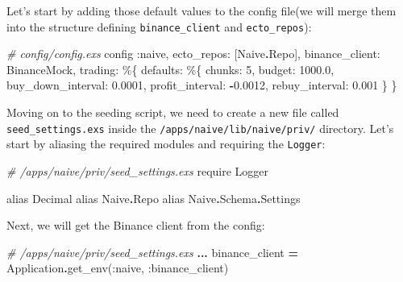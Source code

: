 \documentclass[
  oneside]{book}
\newenvironment{Shaded}{\begin{snugshade}}{\end{snugshade}}
\newcommand{\CommentTok}[1]{\textcolor[rgb]{0.56,0.35,0.01}{\textit{#1}}}
\newcommand{\ConstantTok}[1]{\textcolor[rgb]{0.00,0.00,0.00}{#1}}
\newcommand{\DecValTok}[1]{\textcolor[rgb]{0.00,0.00,0.81}{#1}}
\newcommand{\FloatTok}[1]{\textcolor[rgb]{0.00,0.00,0.81}{#1}}
\newcommand{\ImportTok}[1]{#1}
\newcommand{\NormalTok}[1]{#1}
\newcommand{\OperatorTok}[1]{\textcolor[rgb]{0.81,0.36,0.00}{\textbf{#1}}}
\newcommand{\VariableTok}[1]{\textcolor[rgb]{0.00,0.00,0.00}{#1}}
\begin{document}
Let's start by adding those default values to the config file(we will merge them into the structure defining \texttt{binance\_client} and \texttt{ecto\_repos}):

\begin{Shaded}
\begin{Highlighting}[]
\CommentTok{\# config/config.exs}
\NormalTok{config }\VariableTok{:naive}\NormalTok{,}
  \VariableTok{ecto\_repos:}\NormalTok{ [}\ConstantTok{Naive}\OperatorTok{.}\ConstantTok{Repo}\NormalTok{],}
  \VariableTok{binance\_client:} \ConstantTok{BinanceMock}\NormalTok{,}
  \VariableTok{trading:}\NormalTok{ \%\{}
    \VariableTok{defaults:}\NormalTok{ \%\{}
      \VariableTok{chunks:} \DecValTok{5}\NormalTok{,}
      \VariableTok{budget:} \FloatTok{1000.0}\NormalTok{,}
      \VariableTok{buy\_down\_interval:} \FloatTok{0.0001}\NormalTok{,}
      \VariableTok{profit\_interval:} \OperatorTok{{-}}\FloatTok{0.0012}\NormalTok{,}
      \VariableTok{rebuy\_interval:} \FloatTok{0.001}
\NormalTok{    \}}
\NormalTok{  \}}
\end{Highlighting}
\end{Shaded}

Moving on to the seeding script, we need to create a new file called \texttt{seed\_settings.exs} inside the \texttt{/apps/naive/lib/naive/priv/} directory. Let's start by aliasing the required modules and requiring the \texttt{Logger}:

\begin{Shaded}
\begin{Highlighting}[]
\CommentTok{\# /apps/naive/priv/seed\_settings.exs}
\ImportTok{require} \ConstantTok{Logger}

\ImportTok{alias} \ConstantTok{Decimal}
\ImportTok{alias} \ConstantTok{Naive}\OperatorTok{.}\ConstantTok{Repo}
\ImportTok{alias} \ConstantTok{Naive}\OperatorTok{.}\ConstantTok{Schema}\OperatorTok{.}\ConstantTok{Settings}
\end{Highlighting}
\end{Shaded}

Next, we will get the Binance client from the config:

\begin{Shaded}
\begin{Highlighting}[]
\CommentTok{\# /apps/naive/priv/seed\_settings.exs}
\OperatorTok{...}
\NormalTok{binance\_client }\OperatorTok{=} \ConstantTok{Application}\OperatorTok{.}\NormalTok{get\_env(}\VariableTok{:naive}\NormalTok{, }\VariableTok{:binance\_client}\NormalTok{)}
\end{Highlighting}
\end{Shaded}
\end{document}
